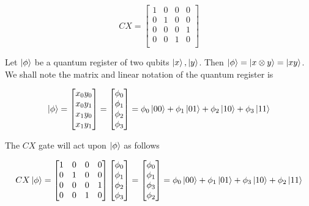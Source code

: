 \begin{equation}
    CX=\begin{bmatrix}
        1 & 0 & 0 & 0 \\
        0 & 1 & 0 & 0 \\
        0 & 0 & 0 & 1 \\
        0 & 0 & 1 & 0 \\
    \end{bmatrix}
\end{equation}

Let $\ket{\phi}$ be a quantum register of two qubits $\ket{x},\ket{y}$. Then
$\ket{\phi}=\ket{x\otimes y}=\ket{xy}$. We shall note the matrix and linear notation
of the quantum register is

\begin{equation}
    \ket{\phi}=
    \begin{bmatrix}
        x_0y_0\\
        x_0y_1\\
        x_1y_0\\
        x_1y_1
    \end{bmatrix}=
    \begin{bmatrix}
        \phi_0\\
        \phi_1\\
        \phi_2\\
        \phi_3
    \end{bmatrix}=
    \phi_0\ket{00}+\phi_1\ket{01}+\phi_2\ket{10}+\phi_3\ket{11}
\end{equation}

The $CX$ gate will act upon $\ket{\phi}$ as follows

\begin{equation}
    CX\ket{\phi}=\begin{bmatrix}
        1 & 0 & 0 & 0 \\
        0 & 1 & 0 & 0 \\
        0 & 0 & 0 & 1 \\
        0 & 0 & 1 & 0
    \end{bmatrix}
    \begin{bmatrix}
        \phi_0 \\
        \phi_1 \\
        \phi_2 \\
        \phi_3
    \end{bmatrix}=
    \begin{bmatrix}
        \phi_0 \\
        \phi_1 \\
        \phi_3 \\
        \phi_2
    \end{bmatrix}=
    \phi_0\ket{00}+\phi_1\ket{01}+\phi_3\ket{10}+\phi_2\ket{11}
\end{equation}

